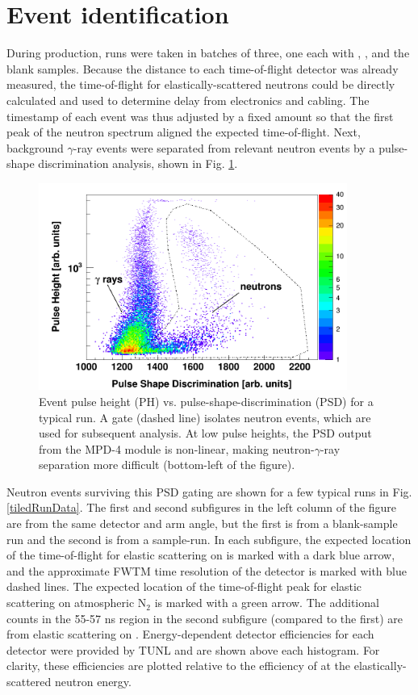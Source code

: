 \section{Event identification}
During production, runs were taken in batches of three, one each with \snTwelve,
\snFour, and the blank samples. Because the distance to each time-of-flight detector
was already measured, the time-of-flight for elastically-scattered neutrons could
be directly calculated and used to determine delay from electronics and cabling.
The timestamp of each event was thus adjusted by a fixed amount
so that the first peak of the neutron spectrum aligned the expected
time-of-flight. Next, background $\gamma$-ray events were separated from relevant
neutron events by a pulse-shape discrimination analysis, shown in Fig. \ref{PHPSDPlot}.

\begin{figure}[ht]
    \includegraphics[width=0.9\textwidth]{figures/PHPSDPlot.png}
    \caption[Event pulse height (PH) vs. pulse-shape-discrimination (PSD) for
    a typical run]
    {
        Event pulse height (PH) vs. pulse-shape-discrimination (PSD) for
        a typical run. A gate (dashed line) isolates neutron events, which are
        used for subsequent analysis. At low pulse heights, the PSD output from the
        MPD-4 module is non-linear, making neutron-$\gamma$-ray separation more difficult
        (bottom-left of the figure).
    }
    \label{PHPSDPlot}
\end{figure}

Neutron events surviving this PSD gating are shown for a few typical runs in Fig. 
\ref{tiledRunData}. The first and second subfigures in the left column of the figure are from 
the same detector and arm angle, but the first is from a blank-sample run and
the second is from a \snFour sample-run. In each subfigure, the expected location
of the time-of-flight for elastic scattering on \snFour is marked with a dark blue arrow,
and the approximate FWTM time
resolution of the detector is marked with blue dashed lines. The expected
location of the time-of-flight peak for elastic scattering on atmospheric
N$_{2}$ is marked with a green arrow. The additional counts in the 55-57 ns region in
the second subfigure (compared to the first) are from elastic scattering on
\snFour. Energy-dependent detector efficiencies for each detector were provided by TUNL
and are shown above each histogram. For clarity, these efficiencies are plotted
relative to the efficiency of at the elastically-scattered neutron energy.

